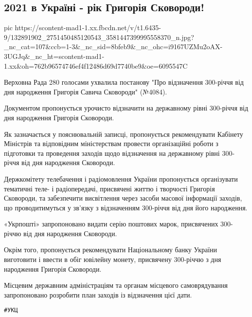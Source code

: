  
 
 
 
 
\subsection{2021 в Україні - рік Григорія Сковороди!}

\ifcmt
  pic https://scontent-mad1-1.xx.fbcdn.net/v/t1.6435-9/132891902_2751450485120543_3581447399995558370_n.jpg?_nc_cat=107&ccb=1-3&_nc_sid=8bfeb9&_nc_ohc=i9167UZMu2oAX-3UGJq&_nc_ht=scontent-mad1-1.xx&oh=762b96574746ef4f12486d69d7740be9&oe=6095547C
\fi

Верховна Рада 280 голосами ухвалила постанову "Про відзначення 300-річчя від
дня народження Григорія Савича Сковороди" (№4084).

Документом пропонується урочисто відзначити на державному рівні 300-річчя від
дня народження Григорія Сковороди.

Як зазначається у пояснювальній записці, пропонується рекомендувати Кабінету
Міністрів та відповідним міністерствам провести організаційні роботи з
підготовки та проведення заходів щодо відзначення на державному рівні 300-річчя
від дня народження Сковороди.

Держкомітету телебачення і радіомовлення України пропонується організувати
тематичні теле- і радіопередачі, присвячені життю і творчості Григорія
Сковороди, та забезпечити висвітлення через засоби масової інформації заходів,
що проводитимуться у зв'язку з відзначенням 300-річчя від дня його народження.

«Укрпошті» запропоновано видати серію поштових марок, присвячених 300-річчю від
дня народження Сковороди.

Окрім того, пропонується рекомендувати Національному банку України виготовити і
ввести в обіг ювілейну монету, присвячену 300-річчю з дня народження Григорія
Сковороди.

Місцевим державним адміністраціям та органам місцевого самоврядування
запропоновано розробити план заходів із відзначення цієї дати.

\verb|#УКЦ|
